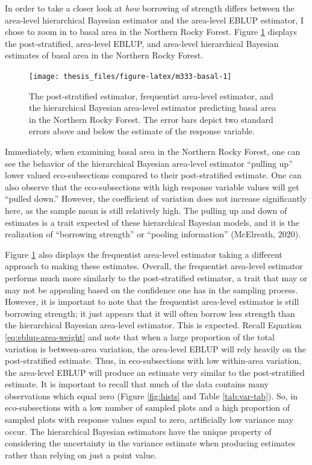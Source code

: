 \documentclass[12pt,twoside]{reedthesis}
\begin{document}
In order to take a closer look at \emph{how} borrowing of strength differs between the area-level hierarchical Bayesian estimator and the area-level EBLUP estimator, I chose to zoom in to basal area in the Northern Rocky Forest. Figure \ref{fig:m333-basal} displays the post-stratified, area-level EBLUP, and area-level hierarchical Bayesian estimates of basal area in the Northern Rocky Forest.
\begin{figure}

{\centering \texttt{[image: thesis\_files/figure-latex/m333-basal-1]} 

}

\caption[Post-stratified, area-level EBLUP, and area-level HB estimates in M333]{The post-stratified estimator, frequentist area-level estimator, and the hierarchical Bayesian area-level estimator predicting basal area in the Northern Rocky Forest. The error bars depict two standard errors above and below the estimate of the response variable.}\label{fig:m333-basal}
\end{figure}
Immediately, when examining basal area in the Northern Rocky Forest, one can see the behavior of the hierarchical Bayesian area-level estimator ``pulling up'' lower valued eco-subsections compared to their post-stratified estimate. One can also observe that the eco-subsections with high response variable values will get ``pulled down.'' However, the coefficient of variation does not increase significantly here, as the sample mean is still relatively high. The pulling up and down of estimates is a trait expected of these hierarchical Bayesian models, and it is the realization of ``borrowing strength'' or ``pooling information'' (McElreath, 2020).

Figure \ref{fig:m333-basal} also displays the frequentist area-level estimator taking a different approach to making these estimates. Overall, the frequentist area-level estimator performs much more similarly to the post-stratified estimator, a trait that may or may not be appealing based on the confidence one has in the sampling process. However, it is important to note that the frequentist area-level estimator is still borrowing strength; it just appears that it will often borrow less strength than the hierarchical Bayesian area-level estimator. This is expected. Recall Equation \eqref{eq:eblup-area-weight} and note that when a large proportion of the total variation is between-area variation, the area-level EBLUP will rely heavily on the post-stratified estimate. Thus, in eco-subsections with low within-area variation, the area-level EBLUP will produce an estimate very similar to the post-stratified estimate. It is important to recall that much of the data contains many observations which equal zero (Figure \ref{fig:hists} and Table \ref{tab:var-tab}). So, in eco-subsections with a low number of sampled plots and a high proportion of sampled plots with response values equal to zero, artificially low variance may occur. The hierarchical Bayesian estimators have the unique property of considering the uncertainty in the variance estimate when producing estimates rather than relying on just a point value.
\end{document}
